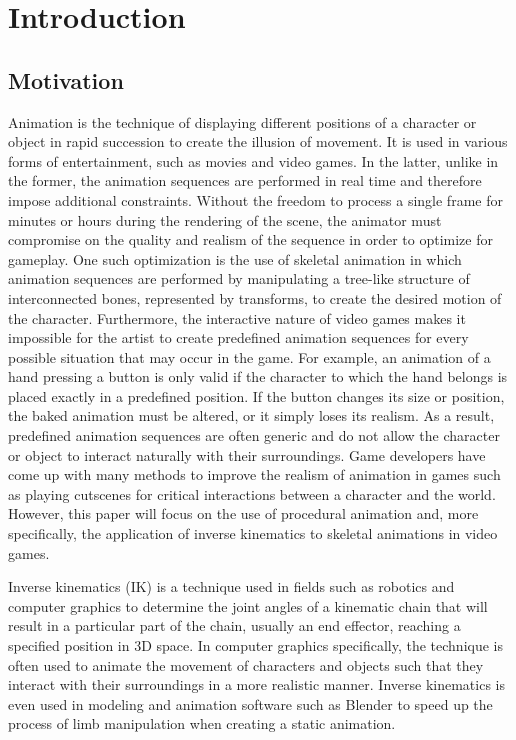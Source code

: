 \chapter{Introduction}
\section{Motivation} 
Animation is the technique of displaying different positions of a character or
object in rapid succession to create the illusion of movement. It is used in
various forms of entertainment, such as movies and video games. In the latter,
unlike in the former, the animation sequences are performed in real time and
therefore impose additional constraints. Without the freedom to process a single
frame for minutes or hours during the rendering of the scene, the animator must
compromise on the quality and realism of the sequence in order to optimize for
gameplay. One such optimization is the use of skeletal animation in which
animation sequences are performed by manipulating a tree-like structure of
interconnected bones, represented by transforms, to create the desired motion of
the character. Furthermore, the interactive nature of video games makes it
impossible for the artist to create predefined animation sequences for every
possible situation that may occur in the game. For example, an animation of
a hand pressing a button is only valid if the character to which the hand
belongs is placed exactly in a predefined position. If the button changes its
size or position, the baked animation must be altered, or it simply loses its
realism. As a result, predefined animation sequences are often generic and
do not allow the character or object to interact naturally with their
surroundings. Game developers have come up with many methods to improve the
realism of animation in games such as playing cutscenes for critical
interactions between a character and the world. However, this paper will focus
on the use of procedural animation and, more specifically, the application of
inverse kinematics to skeletal animations in video games.

Inverse kinematics (IK) is a technique used in fields such as robotics and computer
graphics to determine the joint angles of a kinematic chain that will result in
a particular part of the chain, usually an end effector, reaching a specified
position in 3D space. In computer graphics specifically, the technique is often
used to animate the movement of characters and objects such that they interact
with their surroundings in a more realistic manner. Inverse kinematics is even
used in modeling and animation software such as Blender \cite{blender_ik2} to
speed up the process of limb manipulation when creating a static animation.


